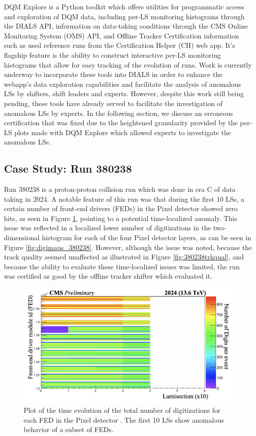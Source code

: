 DQM Explore is a Python toolkit which offers utilities for programmatic access and exploration of DQM data, including per-LS monitoring histograms through the DIALS API, information on data-taking conditions through the CMS Online Monitoring System (OMS) API, and Offline Tracker Certification information such as used reference runs from the Certification Helper (CH) web app. It's flagship feature is the ability to construct interactive per-LS monitoring histograms that allow for easy tracking of the evolution of runs. Work is currently underway to incorporate these tools into DIALS in order to enhance the webapp's data exploration capabilities and facilitate the analysis of anomalous LSs by shifters, shift leaders and experts. However, despite this work still being pending, these tools have already served to facilitate the investigation of anomalous LSs by experts. In the following section, we discuss an erroneous certification that was fixed due to the heightened granularity provided by the per-LS plots made with DQM Explore which allowed experts to investigate the anomalous LSs.

\subsection{Case Study: Run 380238}

Run 380238 is a proton-proton collision run which was done in era C of data taking in 2024. A notable feature of this run was that during the first 10 LSs, a certain number of front-end drivers (FEDs) in the Pixel detector showed zero hits, as seen in Figure \ref{fig:digi_fed_380238}, pointing to a potential time-localized anomaly. This issue was reflected in a localized lower number of digitizations in the two-dimensional histogram for each of the four Pixel detector layers, as can be seen in Figure \ref{fig:digimaps_380238}. However, although the issue was noted, because the track quality seemed unaffected as illustrated in Figure \ref{fig:380238trkqual}, and because the ability to evaluate these time-localized issues was limited, the run was certified as good by the offline tracker shifter which evaluated it.

\begin{figure}[h]
    \centering
    \includegraphics[width=0.5\linewidth]{images/digi_fed_380238.png}
    \caption{Plot of the time evolution of the total number of digitizations for each FED in the Pixel detector \cite{CMS-DP-2024-070}. The first 10 LSs show anomalous behavior of a subset of FEDs.}
    \label{fig:digi_fed_380238}
\end{figure}

